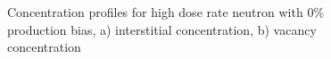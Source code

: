 \documentclass[a4paper]{article}
\begin{document}
    \begin{figure}[h!]  %
      \centering
      \qquad
      \caption{Concentration profiles for high dose rate neutron with 0\% production bias, a) interstitial concentration, b) vacancy concentration}
      \label{figure:concentrations_neutron_0_1e-3}
    \end{figure}
\end{document}
